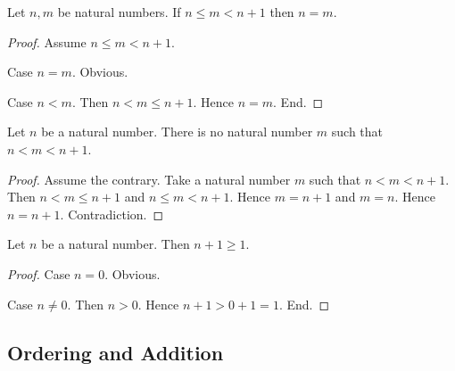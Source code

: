 \documentclass[10pt]{article}
\begin{document}
  \begin{forthel}
    \begin{proposition}[id=ARITHMETIC_04_8792330561650688,printid]
      Let $n, m$ be natural numbers.
      If $n \leq m < n + 1$ then $n = m$.
    \end{proposition}
    \begin{proof}
      Assume $n \leq m < n + 1$.

      Case $n = m$. Obvious.

      Case $n < m$.
        Then $n < m \leq n + 1$.
        Hence $n = m$.
      End.
    \end{proof}
  \end{forthel}

  \begin{forthel}
    \begin{corollary}[id=ARITHMETIC_04_1802826644717568,printid]
      Let $n$ be a natural number.
      There is no natural number $m$ such that $n < m < n + 1$.
    \end{corollary}
    \begin{proof}
      Assume the contrary.
      Take a natural number $m$ such that $n < m < n + 1$.
      Then $n < m \leq n + 1$ and $n \leq m < n + 1$.
      Hence $m = n + 1$ and $m = n$.
      Hence $n = n + 1$.
      Contradiction.
    \end{proof}
  \end{forthel}

  \begin{forthel}
    \begin{proposition}[id=ARITHMETIC_04_990407185924096,printid]
      Let $n$ be a natural number.
      Then $n + 1 \geq 1$.
    \end{proposition}
    \begin{proof}
      Case $n = 0$. Obvious.

      Case $n \neq 0$.
        Then $n > 0$.
        Hence $n + 1 > 0 + 1 = 1$.
      End.
    \end{proof}
  \end{forthel}


  \subsection*{Ordering and Addition}
\end{document}
